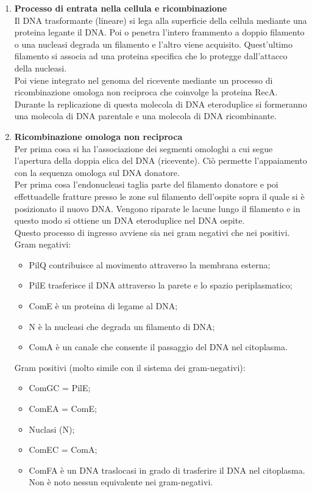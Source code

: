 \begin{enumerate}
    \item \textbf{Processo di entrata nella cellula e ricombinazione}
    \\Il DNA trasformante (lineare) si lega alla superficie della cellula mediante una proteina legante il DNA. Poi o penetra l'intero frammento a doppio filamento o una nucleasi degrada un filamento e l'altro viene acquisito. Quest'ultimo filamento si associa ad una proteina specifica che lo protegge dall'attacco della nucleasi.
    \\Poi viene integrato nel genoma del ricevente mediante un processo di ricombinazione omologa non reciproca che coinvolge la proteina RecA. 
    \\Durante la replicazione di questa molecola di DNA eteroduplice si formeranno una molecola di DNA parentale e una molecola di DNA ricombinante. 
    \item \textbf{Ricombinazione omologa non reciproca}
    \\Per prima cosa si ha l'associazione dei segmenti omologhi a cui segue l'apertura della doppia elica del DNA (ricevente). Ciò permette l'appaiamento con la sequenza omologa sul DNA donatore. 
    \\Per prima cosa l'endonucleasi taglia parte del filamento donatore e poi effettuadelle fratture presso le zone sul filamento dell'ospite sopra il quale si è posizionato il nuovo DNA. Vengono riparate le lacune lungo il filamento e in questo modo si ottiene un DNA eteroduplice nel DNA ospite. 
    \\Questo processo di ingresso avviene sia nei gram negativi che nei positivi.
    \\Gram negativi:
    \begin{itemize}
        \item PilQ contribuisce al movimento attraverso la membrana esterna;
        \item PilE trasferisce il DNA attraverso la parete e lo spazio periplasmatico;
        \item ComE è un proteina di legame al DNA; 
        \item N è la nucleasi che degrada un filamento di DNA;
        \item ComA è un canale che consente il passaggio del DNA nel citoplasma.
    \end{itemize}
    Gram positivi (molto simile con il sistema dei gram-negativi):
    \begin{itemize}
        \item ComGC = PilE;
        \item ComEA = ComE;
        \item Nuclasi (N);
        \item ComEC = ComA;
        \item ComFA è un DNA traslocasi in grado di trasferire il DNA nel citoplasma. Non è noto nessun equivalente nei gram-negativi.
    \end{itemize}
\end{enumerate}
